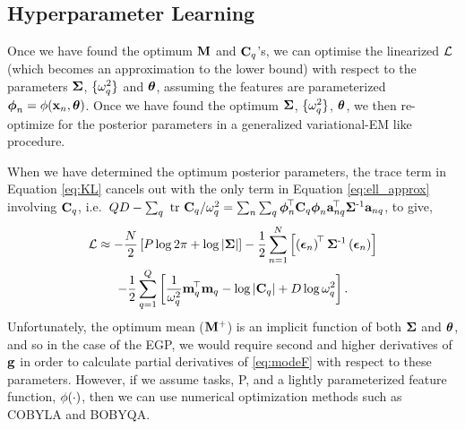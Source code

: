 \subsection{Hyperparameter Learning}
Once we have found the optimum $\mathbf{M}$ and $\mathbf{C}_q$'s, we can optimise
the linearized $\mathcal{L}$ (which becomes an approximation to the lower bound)
with respect to the parameters $\mathbf{\Sigma}$, $\{ \omega^2_q \}$ and $\boldsymbol\theta$,
assuming the features are parameterized $\boldsymbol\phi_n = \phi\!\left({{\mathbf{x}_n,
    \boldsymbol\theta}}\right)$. Once we have found the optimum $\mathbf{\Sigma}$, $\{ \omega^2_q \}$,
$\boldsymbol\theta$, we then re-optimize for the posterior parameters  in a generalized
variational-EM like procedure.

When we have determined the optimum posterior parameters, the trace term in
Equation \eqref{eq:KL} cancels out with the only term in Equation \eqref{eq:ell_approx} 
involving $\mathbf{C}_q$, i.e.\ $QD -
\sum_q\mbox{ \rm tr }{\ensuremath{\mathbf{C}}_q}/\omega^2_q = 
\sum_n \sum_q \boldsymbol\phi_n^{\!\top}\mathbf{C}_q  \boldsymbol\phi_n\mathbf{a}_{nq}^{\!\top}\mathbf{\Sigma}^{\text{-}1} \mathbf{a}_{nq}$,
to give,
\begin{multline}
    \mathcal{L} \approx 
        - \frac{N}{2}\left[{P\log{2\pi} + \log\left|{\mathbf{\Sigma}}\right|}\right]
    - \frac{1}{2} \sum^N_{n=1} \left[{
        \left({\boldsymbol{ \epsilon }_n}\right)^{\!\top}
        \mathbf{\Sigma}^{\text{-}1}
        \left({\boldsymbol{ \epsilon }_n}\right)}\right] \\
        -\frac{1}{2} \sum^{Q}_{q=1} \left[{
        \frac{1}{\omega^2_q} \mathbf{m}_q^{\!\top}\mathbf{m}_q
        - \log\left|{\mathbf{C}_q}\right| + D \log \omega^2_q}\right].
    \label{eq:modeF}
\end{multline}
Unfortunately, the optimum mean ($\mathbf{M}^{+}$) is an implicit function of both $\mathbf{\Sigma}$ and
$\boldsymbol\theta$, and so in the case of the EGP, we would require second and higher
derivatives of $\mathbf{g}$ in order to calculate partial derivatives of
\eqref{eq:modeF} with respect to these parameters. 
    However, if we assume  tasks, P, and a lightly
parameterized feature function, $\phi\!\left({{\cdot}}\right)$, then we can use numerical 
optimization methods such as COBYLA and BOBYQA. 



 
